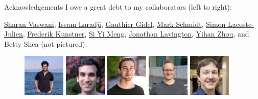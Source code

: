 \documentclass[mathserif,notheorems, hyperref={colorlinks, urlcolor=blue, linkcolor=blue}]{beamer}
\begin{document}
    \begin{frame}{Acknowledgements}
        I owe a great debt to my collaborators (left to right):
        \begin{center}    
            \href{https://vaswanis.github.io/}{Sharan Vaswani}, \href{https://issamlaradji.github.io/}{Issam Laradji}, \href{https://gauthiergidel.github.io/}{Gauthier Gidel}, \href{https://www.cs.ubc.ca/~schmidtm/}{Mark Schmidt}, \href{http://www.iro.umontreal.ca/~slacoste/}{Simon Lacoste-Julien}, \href{https://fkunstner.github.io/}{Frederik Kunstner}, \href{https://www.cs.ubc.ca/~mengxixi/}{Si Yi Meng}, \href{https://wilderlavington.github.io/}{Jonathan Lavington}, \href{https://joeyandbluewhale.github.io/}{Yihan Zhou}, and Betty Shea (not pictured). 
        \end{center}
        
        \begin{figure}
            \centering
            \includegraphics[width=0.18\textwidth]{collaborators/sharan}
            \includegraphics[width=0.18\textwidth]{collaborators/issam}
            \includegraphics[width=0.18\textwidth]{collaborators/gauthier}
            \includegraphics[width=0.18\textwidth]{collaborators/mark}
            \includegraphics[width=0.18\textwidth]{collaborators/simon}


\end{figure}
\end{frame}
\end{document}
